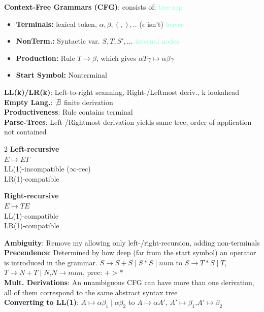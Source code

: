 \textbf{Context-Free Grammars (CFG)}: consists of: \textcolor{Aquamarine}{tree-rep}
\begin{itemize}[leftmargin = *,noitemsep]
\item \textbf{Terminals:} lexical token, $\alpha, \beta, (,),..$ ($\epsilon$ isn't) \textcolor{Aquamarine}{leaves}
\item \textbf{NonTerm.:} Syntactic var. $S,T,S',...$ \textcolor{Aquamarine}{internal nodes}
\item \textbf{Production:} Rule $T \mapsto \beta$, which gives $\alpha T \gamma \mapsto \alpha \beta \gamma$
\item \textbf{Start Symbol:} Nonterminal 
 \end{itemize}
 \textbf{LL(k)/LR(k)}: Left-to-right scanning, Right-/Leftmost deriv., k lookahead\\
\textbf{Empty Lang.}: $\not \exists$ finite derivation\\
\textbf{Productiveness}: Rule contains terminal\\
\textbf{Parse-Trees}: Left-/Rightmost derivation yields same tree, order of application not contained\\
\begin{multicols}{2}
\textbf{Left-recursive}\\
$E \mapsto ET$\\ 
LL(1)-incompatible  ($\infty$-rec)\\
LR(1)-compatible

\columnbreak

\textbf{Right-recursive}\\
$E \mapsto TE$\\ 
LL(1)-compatible\\
LR(1)-compatible

\end{multicols}
\textbf{Ambiguity}: Remove my allowing only left-/right-recursion, adding non-terminals\\
\textbf{Precendence}: Determined by how deep (far from the start symbol) an operator is introduced in the grammar. {\color{Aquamarine}$S \to S+S\mid S*S\mid num$ to $S\to T * S \mid T$,$T\to N + T \mid N$,$N\to num $, prec: $+>*$ }\\
\textbf{Mult. Derivations}: An unambiguous CFG can have more than one derivation, all of them correspond to the same abstract syntax tree\\
\textbf{Converting to LL(1)}: $A \mapsto \alpha \beta_1 \mid \alpha \beta_2$ to $A \mapsto \alpha A'$, $A' \mapsto \beta_1$,$A' \mapsto \beta_2$\\



